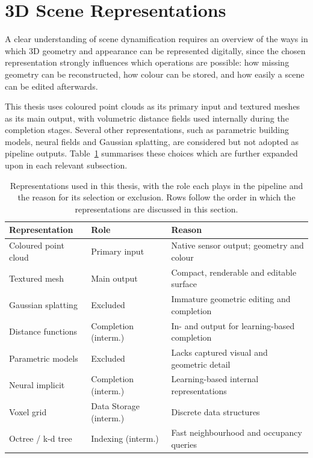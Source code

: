 \section{3D Scene Representations}
\label{sec:bg_representations}

A clear understanding of scene dynamification requires an overview of the ways in which 3D geometry and appearance can be represented digitally, since the chosen representation strongly influences which operations are possible: how missing geometry can be reconstructed, how colour can be stored, and how easily a scene can be edited afterwards.

This thesis uses coloured point clouds as its primary input and textured meshes as its main output, with volumetric distance fields used internally during the completion stages. Several other representations, such as parametric building models, neural fields and Gaussian splatting, are considered but not adopted as pipeline outputs. Table~\ref{tab:rep_overview} summarises these choices which are further expanded upon in each relevant subsection.

\begin{table}[htbp]
    \centering
    \caption[3D representations used in this thesis]{Representations used in this thesis, with the role each plays in the pipeline and the reason for its selection or exclusion. Rows follow the order in which the representations are discussed in this section.}
    \label{tab:rep_overview}
    \renewcommand{\arraystretch}{1.2}
    \begin{tabularx}{\textwidth}{l l X}
        \toprule
        \textbf{Representation} & \textbf{Role} & \textbf{Reason} \\
        \midrule
        Coloured point cloud           & Primary input        & Native sensor output; geometry and colour \\
        Textured mesh                  & Main output          & Compact, renderable and editable surface \\
        Gaussian splatting             & Excluded             & Immature geometric editing and completion \\
        \midrule
        Distance functions                & Completion (interm.) & In- and output for learning-based completion \\
        Parametric models              & Excluded             & Lacks captured visual and geometric detail \\
        Neural implicit                & Completion (interm.) & Learning-based internal representations\\
        \midrule
        Voxel grid                     & Data Storage (interm.)& Discrete data structures \\
        Octree / k-d tree              & Indexing (interm.)   & Fast neighbourhood and occupancy queries \\
        \bottomrule
    \end{tabularx}
\end{table}


